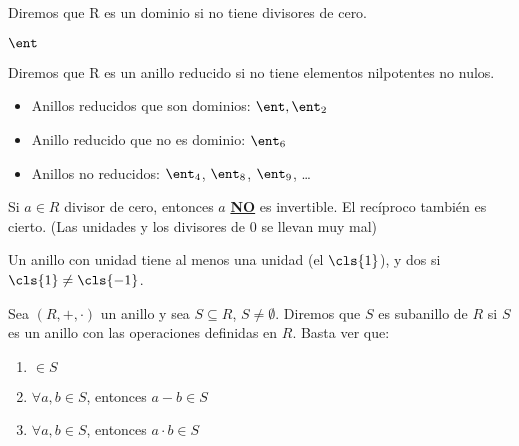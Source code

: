 \begin{defn}
Diremos que R es un dominio si no tiene divisores de cero.
\end{defn}

\begin{example}
	$\ent$
\end{example}

\begin{defn}
Diremos que R es un anillo reducido si no tiene elementos nilpotentes no nulos.
\end{defn}

\begin{example}
	\begin{itemize}
		\item Anillos reducidos que son dominios: $\ent, \ent_2$
		\item Anillo reducido que no es dominio: $\ent_6$
		\item Anillos no reducidos: $\ent_4$, $\ent_8$, $\ent_9$, \dots
	\end{itemize}
\end{example}


\obs Si $a \in R$ divisor de cero, entonces $a$ \underline{\bf NO} es invertible. El recíproco también es cierto. (Las unidades y los divisores de 0 se llevan muy mal)

\obs Un anillo con unidad tiene al menos una unidad (el $\cls{1}$), y dos si $\cls{1} \neq \cls{-1}$. %

\begin{defn}[Subanillo]
Sea $(R,+,\cdot)$ un anillo y sea $S \subseteq R$, $S \neq \emptyset$. Diremos que $S$ es subanillo de $R$ si $S$ es un anillo con las operaciones definidas en $R$. Basta ver que:
\begin{enumerate}
	\item \one $\in S$
	\item $\forall a,b \in S$, entonces $a-b \in S$
	\item $\forall a,b \in S$, entonces $a\cdot b \in S$
\end{enumerate}
\end{defn}



